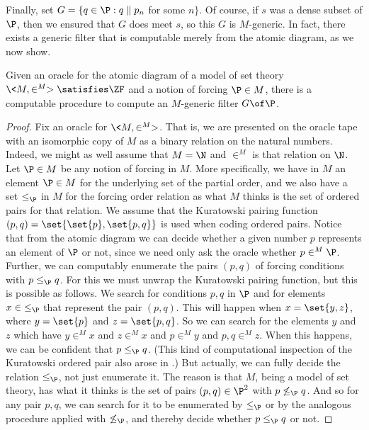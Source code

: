\documentclass{amsart}
\begin{document}
Finally, set $G = \{ q \in \P : q \parallel p_n$ for some $n\}$.
Of course, if $s$ was a dense
subset of $\P$, then we ensured that $G$ does meet $s$, so this $G$ is $M$-generic.
In fact, there exists a generic filter that is computable merely from the atomic diagram, as we now
show.
\begin{theorem}\label{Theorem.Computing-generic-filter}
Given an oracle for the atomic diagram of a model of set theory $\<M,\in^M>\satisfies\ZF$ and a notion of forcing $\P\in M$, there is a computable procedure to compute an $M$-generic filter $G\of\P$.
\end{theorem}
\begin{proof}
Fix an oracle for $\<M,\in^M>$. That is, we are presented on the oracle tape with an isomorphic copy of $M$ as a binary relation on the natural numbers. Indeed, we might as well assume that $M=\N$ and $\in^M$ is that relation on $\N$. Let $\P\in M$ be any notion of forcing in $M$. More specifically, we have in $M$ an element $\P\in M$ for the underlying set of the partial order, and we also have a set $\leq_\P$ in $M$ for the forcing order relation as what $M$ thinks is the set of ordered pairs for that relation. We assume that the Kuratowski pairing function
$(p,q)=\set{\set{p},\set{p,q}}$ is used when coding ordered pairs.
Notice that from the atomic diagram we can decide whether a given number $p$ represents an element of $\P$ or not, since we need only ask the oracle whether $p\in^M\P$. Further, we can computably enumerate the pairs $(p,q)$ of forcing conditions with $p\leq_\P q$. For this we must unwrap the Kuratowski pairing function, but this is possible as follows. We search for conditions $p,q$ in $\P$ and for elements $x\in{\leq_\P}$ that represent the pair $(p,q)$. This will happen when $x=\set{y,z}$, where $y=\set{p}$ and $z=\set{p,q}$. So we can search for the elements $y$ and $z$ which have $y\in^M x$ and $z\in^M x$ and $p\in^M y$ and $p,q\in^M z$. When this happens, we can be confident that $p\leq_\P q$. (This kind of computational inspection of the Kuratowski ordered pair also arose in \cite{GodziszewskiHamkins2017:Computable-quotient-presentations-of-models-of-arithmetic-and-set-theory}.)
But actually, we can fully decide the relation $\leq_\P$, not just enumerate it. The reason is that $M$, being a model of set theory, has what it thinks is the set of pairs $(p,q)\in\P^2$ with $p\not\leq_\P q$. And so for any pair $p,q$, we can search for it to be enumerated by $\leq_\P$ or by the analogous procedure applied with $\not\leq_\P$, and thereby decide whether $p\leq_\P q$ or not.

\end{proof}
\end{document}
